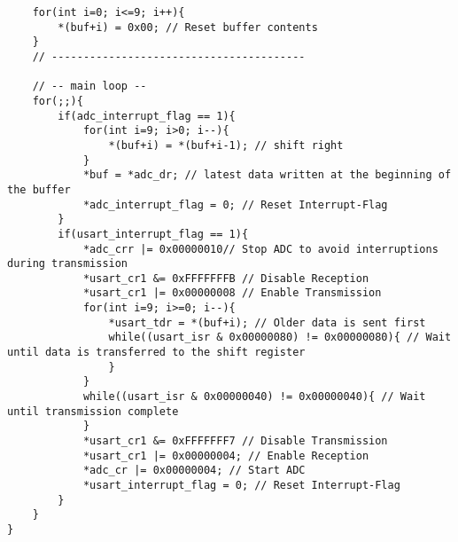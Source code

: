 \documentclass[11pt]{report}
\begin{document}
\begin{lstlisting}
	for(int i=0; i<=9; i++){
		*(buf+i) = 0x00; // Reset buffer contents
	}
	// ----------------------------------------
	
	// -- main loop --
	for(;;){
		if(adc_interrupt_flag == 1){
			for(int i=9; i>0; i--){
				*(buf+i) = *(buf+i-1); // shift right
			}
			*buf = *adc_dr; // latest data written at the beginning of the buffer
			*adc_interrupt_flag = 0; // Reset Interrupt-Flag
		}
		if(usart_interrupt_flag == 1){
			*adc_crr |= 0x00000010// Stop ADC to avoid interruptions during transmission
			*usart_cr1 &= 0xFFFFFFFB // Disable Reception
			*usart_cr1 |= 0x00000008 // Enable Transmission
			for(int i=9; i>=0; i--){
				*usart_tdr = *(buf+i); // Older data is sent first
				while((usart_isr & 0x00000080) != 0x00000080){ // Wait until data is transferred to the shift register
				}
			}
			while((usart_isr & 0x00000040) != 0x00000040){ // Wait until transmission complete
			}
			*usart_cr1 &= 0xFFFFFFF7 // Disable Transmission
			*usart_cr1 |= 0x00000004; // Enable Reception
			*adc_cr |= 0x00000004; // Start ADC
			*usart_interrupt_flag = 0; // Reset Interrupt-Flag
		}
	}
}
	\end{lstlisting}
\end{document}
